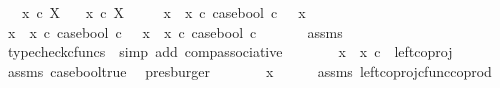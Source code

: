 \begin{isabellebody}
\ \ \ {\isachardoublequoteopen}x{}\ {\isasymin}\isactrlsub c\ X{\isachardoublequoteclose}\isanewline
\ \ \ {\isachardoublequoteopen}x{}\ {\isasymin}\isactrlsub c\ X{\isachardoublequoteclose}\isanewline
\ \ \ \ \ {\isachardoublequoteopen}{\isacharparenleft}{\kern0pt}x{}\ {\isasymamalg}\ x{}\ {\isasymcirc}\isactrlsub c\ case{\isacharunderscore}{\kern0pt}bool{\isacharparenright}{\kern0pt}\ {\isasymcirc}\isactrlsub c\ {\isasymt}\ {\isacharequal}{\kern0pt}\ x{}{\isachardoublequoteclose}\isanewline
%
\isadelimproof
%
\endisadelimproof
%
\isatagproof
{}\isamarkupfalse%
\ {\isacharminus}{\kern0pt}\ \isanewline
\ \ \isamarkupfalse%
\ {\isachardoublequoteopen}{\isacharparenleft}{\kern0pt}x{}\ {\isasymamalg}\ x{}\ {\isasymcirc}\isactrlsub c\ case{\isacharunderscore}{\kern0pt}bool{\isacharparenright}{\kern0pt}\ {\isasymcirc}\isactrlsub c\ {\isasymt}\ {\isacharequal}{\kern0pt}\ {\isacharparenleft}{\kern0pt}x{}\ {\isasymamalg}\ x{}{\isacharparenright}{\kern0pt}\ {\isasymcirc}\isactrlsub c\ case{\isacharunderscore}{\kern0pt}bool\ {\isasymcirc}\isactrlsub c\ {\isasymt}{\isachardoublequoteclose}\isanewline
\ \ \ \ \isamarkupfalse%
\ assms\ \isamarkupfalse%
\ {\isacharparenleft}{\kern0pt}typecheck{\isacharunderscore}{\kern0pt}cfuncs\ {\isacharcomma}{\kern0pt}\ simp\ add{\isacharcolon}{\kern0pt}\ comp{\isacharunderscore}{\kern0pt}associative{}{\isacharparenright}{\kern0pt}\isanewline
\ \ \isamarkupfalse%
\ \isamarkupfalse%
\ {\isachardoublequoteopen}{\isachardot}{\kern0pt}{\isachardot}{\kern0pt}{\isachardot}{\kern0pt}\ {\isacharequal}{\kern0pt}\ {\isacharparenleft}{\kern0pt}x{}\ {\isasymamalg}\ x{}{\isacharparenright}{\kern0pt}\ {\isasymcirc}\isactrlsub c\ \ left{\isacharunderscore}{\kern0pt}coproj\ {\isasymone}\ {\isasymone}{\isachardoublequoteclose}\isanewline
\ \ \ \ \isamarkupfalse%
\ assms\ case{\isacharunderscore}{\kern0pt}bool{\isacharunderscore}{\kern0pt}true\ \isamarkupfalse%
\ presburger\isanewline
\ \ \isamarkupfalse%
\ \isamarkupfalse%
\ {\isachardoublequoteopen}{\isachardot}{\kern0pt}{\isachardot}{\kern0pt}{\isachardot}{\kern0pt}\ {\isacharequal}{\kern0pt}\ x{}{\isachardoublequoteclose}\isanewline
\ \ \ \ \isamarkupfalse%
\ assms\ left{\isacharunderscore}{\kern0pt}coproj{\isacharunderscore}{\kern0pt}cfunc{\isacharunderscore}{\kern0pt}coprod\ \isamarkupfalse%

\end{isabellebody}
